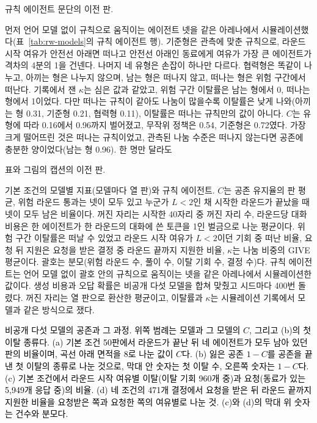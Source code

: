 규칙 에이전트 문단의 이전 판.

{\color{black}먼저 언어 모델 없이 규칙으로 움직이는 에이전트 넷을 같은 아레나에서 시뮬레이션했다(표~\ref{tab:rw-models}의 규칙 에이전트 행). 기준형은 관측에 맞춘 규칙으로, 라운드 시작 여유가 안전선 아래면 떠나고 안전선 아래인 동료에게 여유가 가장 큰 에이전트가 격차의 4분의 1을 건넨다. 나머지 네 유형은 손잡이 하나만 다르다. 협력형은 똑같이 나누고, 아끼는 형은 나누지 않으며, 남는 형은 떠나지 않고, 떠나는 형은 위험 구간에서 떠난다. 기록에서 잰 $\kappa$는 심은 값과 같았고, 위험 구간 이탈률은 남는 형에서 0, 떠나는 형에서 1이었다. 다만 떠나는 규칙이 같아도 나눔이 많을수록 이탈률은 낮게 나와(아끼는 형 0.31, 기준형 0.21, 협력형 0.11), 이탈률은 떠나는 규칙만의 값이 아니다. $C$는 유형에 따라 0.16에서 0.96까지 벌어졌고, 무작위 정책은 0.54, 기준형은 0.72였다. 가장 크게 떨어뜨린 것은 떠나는 규칙이었고, 관측된 나눔 수준은 떠나지 않는다면 공존에 충분한 양이었다(남는 형 0.96). 한 명만 달라도}

표와 그림의 캡션의 이전 판.

기본 조건의 모델별 지표(모델마다 열 판)와 규칙 에이전트. $C$는 공존 유지율의 판 평균, 위험 라운드 통과는 넷이 모두 있고 누군가 $L<2$인 채 시작한 라운드가 끝났을 때 넷이 모두 남은 비율이다. 꺼진 자리는 시작한 40자리 중 꺼진 자리 수, 라운드당 대화 비용은 한 에이전트가 한 라운드의 대화에 쓴 토큰을 1인 벌금으로 나눈 평균이다. 위험 구간 이탈률은 떠날 수 있었고 라운드 시작 여유가 $L<2$이던 기회 중 떠난 비율, 요청 뒤 지원은 요청을 받은 결정 중 라운드 끝까지 지원한 비율, $\kappa$는 나눔 비중의 GIVE 평균이다. 괄호는 분모(위험 라운드 수, 풀이 수, 이탈 기회 수, 결정 수)다. 규칙 에이전트는 언어 모델 없이 괄호 안의 규칙으로 움직이는 넷을 같은 아레나에서 시뮬레이션한 값이다. 생성 비용과 오답 확률은 비공개 다섯 모델을 합쳐 맞췄고 시드마다 400번 돌렸다. 꺼진 자리는 열 판으로 환산한 평균이고, 이탈률과 $\kappa$는 시뮬레이션 기록에서 모델과 같은 방식으로 쟀다.

\textcolor{black}{비공개 다섯 모델의 공존과 그 과정. 위쪽 범례는 모델과 그 모델의 $C$, 그리고 (b)의 첫 이탈 종류다. (a) 기본 조건 50판에서 라운드가 끝난 뒤 네 에이전트가 모두 남아 있던 판의 비율이며, 곡선 아래 면적을 8로 나눈 값이 $C$다. (b) 잃은 공존 $1-C$를 공존을 끝낸 첫 이탈의 종류로 나눈 것으로, 막대 안 숫자는 첫 이탈 수, 오른쪽 숫자는 $1-C$다. (c) 기본 조건에서 라운드 시작 여유별 이탈(이탈 기회 960개 중)과 요청(동료가 있는 5,949개 응답 중)의 비율. (d) 네 조건의 471개 결정에서 요청을 받은 뒤 라운드 끝까지 지원한 비율을 요청받은 쪽과 요청한 쪽의 여유별로 나눈 것. (c)와 (d)의 막대 위 숫자는 건수와 분모다.}


